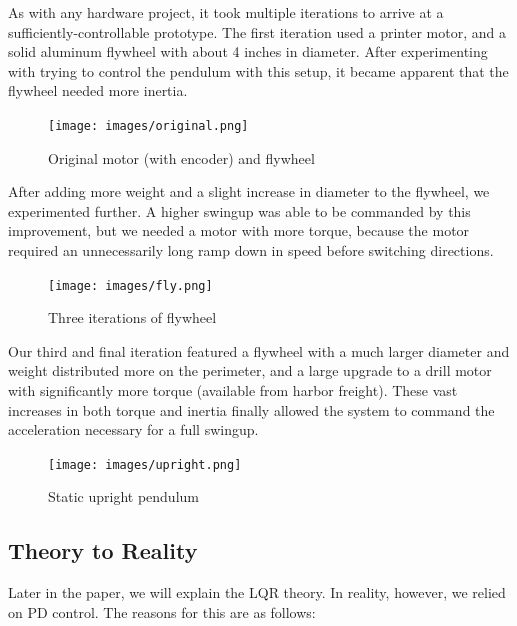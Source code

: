 \documentclass[conference]{IEEEtran}
\begin{document}
As with any hardware project, it
took multiple iterations to arrive at a sufficiently-controllable prototype. The
first iteration used a printer motor, and a solid aluminum flywheel with about 4
inches in diameter.  After experimenting with trying to control the pendulum
with this setup, it became apparent that the flywheel needed more inertia.

\begin{figure}[h]
    \centering
    \texttt{[image: images/original.png]}
    \caption{Original motor (with encoder) and flywheel}
    \label{original}
\end{figure}

After adding more weight and a slight increase in diameter to the
flywheel, we experimented further. A higher swingup was able to be commanded by
this improvement, but we needed a motor with more torque, because the motor
required an unnecessarily long ramp down in speed before switching directions.

\begin{figure}[h]
    \centering
    \texttt{[image: images/fly.png]}
    \caption{Three iterations of flywheel}
    \label{fly}
\end{figure}

Our third and final iteration featured a flywheel with a much larger
diameter and weight distributed more on the perimeter, and a large upgrade to a
drill motor with significantly more torque (available from harbor freight).
These vast increases in both torque and inertia finally allowed the system to
command the acceleration necessary for a full swingup.

\begin{figure}[h]
    \centering
    \texttt{[image: images/upright.png]}
    \caption{Static upright pendulum}
    \label{upright}
\end{figure}

\subsection{Theory to Reality}

Later in the paper, we will explain the LQR theory. In reality, however, we
relied on PD control. The reasons for this are as follows:
\end{document}
